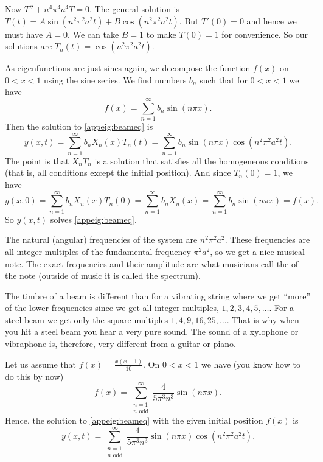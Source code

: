 \documentclass{ximera}
\begin{document}
Now $T'' + n^4 \pi^4 a^4 T = 0$.  The general solution is $T(t) = A \sin (n^2 \pi^2 a^2 t) + B \cos (n^2 \pi^2 a^2 t)$.  But $T'(0) = 0$ and hence we must have $A=0$.  We can take $B=1$ to make $T(0) = 1$ for convenience. So our solutions are $T_n(t) = \cos (n^2 \pi^2 a^2 t)$.

As eigenfunctions are just sines again, we decompose the function $f(x)$ on $0 < x < 1$ using the sine series. We find numbers $b_n$ such that for $0 < x < 1$ we have
\begin{equation*}
    f(x) = \sum_{n=1}^\infty b_n \sin (n \pi x) .
\end{equation*}
Then the solution to \eqref{appeig:beameq} is
\begin{equation*}
    y(x,t) = \sum_{n=1}^\infty b_n X_n(x) T_n(t) = \sum_{n=1}^\infty b_n \sin (n \pi x)  \cos ( n^2 \pi^2 a^2 t ) .
\end{equation*}
The point is that $X_nT_n$ is a solution that satisfies all the homogeneous conditions (that is, all conditions except the initial position).  And since $T_n(0) = 1$, we have
\begin{equation*}
    y(x,0) = \sum_{n=1}^\infty b_n X_n(x) T_n(0) = \sum_{n=1}^\infty b_n X_n(x) = \sum_{n=1}^\infty b_n \sin (n \pi x) = f(x) .
\end{equation*}
So $y(x,t)$ solves \eqref{appeig:beameq}.

The natural (angular) frequencies of the system are $n^2 \pi^2 a^2$. These frequencies are all integer multiples of the fundamental frequency $\pi^2 a^2$, so we get a nice musical note.  The exact frequencies and their amplitude are what musicians call the \emph{} of the note (outside of music it is called the spectrum).

The timbre of a beam is different than for a vibrating string where we get ``more'' of the lower frequencies since we get all integer multiples, $1,2,3,4,5,\ldots$.  For a steel beam we get only the square multiples $1,4,9,16,25,\ldots$.  That is why when you hit a steel beam you hear a very pure sound.  The sound of a xylophone or vibraphone is, therefore, very different from a guitar or piano.

\begin{example}
    Let us assume that $f(x) = \frac{x(x-1)}{10}$. On $0 < x < 1$ we have (you know how to do this by now)
    \begin{equation*}
    f(x) = \sum_{\substack{n=1\\n \text{~odd}}}^\infty \frac{4}{5\pi^3 n^3} \sin (n \pi x) .
    \end{equation*}
    Hence, the solution to \eqref{appeig:beameq} with the given initial position $f(x)$ is
    \begin{equation*}
    y(x,t) = \sum_{\substack{n=1\\n \text{~odd}}}^\infty \frac{4}{5\pi^3 n^3} \sin (n \pi x) \cos ( n^2 \pi^2 a^2 t ) .
    \end{equation*}
\end{example}
\end{document}
